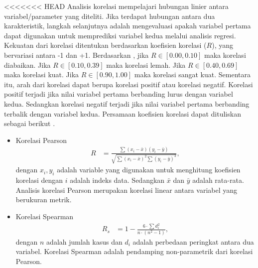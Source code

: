 \begin{spacing}{1.5}
<<<<<<< HEAD
		Analisis korelasi mempelajari hubungan linier antara variabel/parameter yang diteliti. Jika terdapat hubungan antara dua karakteristik, langkah selanjutnya adalah mengevaluasi apakah variabel pertama dapat digunakan untuk memprediksi variabel kedua melalui analisis regresi. Kekuatan dari korelasi ditentukan berdasarkan koefisien korelasi ($R$), yang bervariasi antara -1 dan +1. Berdasarkan , jika $R\in[0.00,0.10]$ maka korelasi diabaikan. Jika $R\in[0.10,0.39]$ maka korelasi lemah. Jika $R\in[0.40,0.69]$ maka korelasi kuat. Jika $R\in[0.90,1.00]$ maka korelasi sangat kuat. Sementara itu, arah dari korelasi dapat berupa korelasi positif atau korelasi negatif. Korelasi positif terjadi jika nilai variabel pertama berbanding lurus dengan variabel kedua. Sedangkan korelasi negatif terjadi jika nilai variabel pertama berbanding terbalik dengan variabel kedua. Persamaan koefisien korelasi dapat dituliskan sebagai berikut  \cite{hidayat2023relationship,Haditiar2020,zhao2022spearman}.
		\begin{itemize}
			\item Korelasi Pearson
			\begin{equation}
				\begin{aligned}
					R &= \frac{\sum (x_i - \bar{x})(y_i - \bar{y})}{\sqrt{\sum (x_i-\bar{x})^2\sum (y_i-\bar{y})^2}},
				\end{aligned}
			\end{equation}
			dengan $x_i, y_i$ adalah variable yang digunakan untuk menghitung koefisien korelasi dengan $i$ adalah indeks data. Sedangkan $\bar{x}$ dan $\bar{y}$ adalah rata-rata. Analisis korelasi Pearson merupakan korelasi linear antara variabel yang berukuran metrik.
			\item Korelasi Spearman
			\begin{equation}
				\begin{aligned}
					R_s &= 1-\frac{6\cdot\sum d_i^2}{n\cdot(n^2-1)},
				\end{aligned}
			\end{equation}
			dengan $n$ adalah jumlah kasus dan $d_i$ adalah perbedaan peringkat antara dua variabel. Korelasi Spearman adalah pendamping non-parametrik dari korelasi Pearson.
		\end{itemize}
	

\end{spacing}

